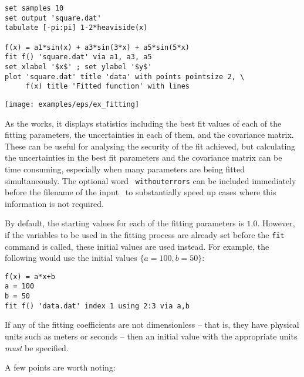 \begin{verbatim}
set samples 10
set output 'square.dat'
tabulate [-pi:pi] 1-2*heaviside(x)

f(x) = a1*sin(x) + a3*sin(3*x) + a5*sin(5*x)
fit f() 'square.dat' via a1, a3, a5
set xlabel '$x$' ; set ylabel '$y$'
plot 'square.dat' title 'data' with points pointsize 2, \
     f(x) title 'Fitted function' with lines
\end{verbatim}

\begin{center}
\texttt{[image: examples/eps/ex\_fitting]}
\end{center}

As the  works, it displays statistics including the best fit
values of each of the fitting parameters, the uncertainties in each of them,
and the covariance matrix. These can be useful for analysing the security of
the fit achieved, but calculating the uncertainties in the best fit parameters
and the covariance matrix can be time consuming, especially when many
parameters are being fitted simultaneously. The optional word {\tt
withouterrors} can be included immediately before the filename of the input
\datafile\ to substantially speed up cases where this information is not
required.

By default, the starting values for each of the fitting parameters is
$1.0$. However, if the variables to be used in the fitting process are already
set before the {\tt fit} command is called, these initial values are used
instead. For example, the following would use the initial values
$\{a=100,b=50\}$:
\begin{verbatim}
f(x) = a*x+b
a = 100
b = 50
fit f() 'data.dat' index 1 using 2:3 via a,b
\end{verbatim}

\noindent If any of the fitting coefficients are not dimensionless -- that is,
they have physical units such as meters or seconds -- then an initial value
with the appropriate units {\it must} be specified.

A few points are worth noting:

